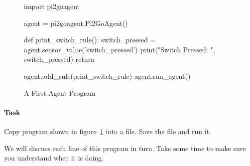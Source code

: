 \documentclass[a4,12pt]{article}
\begin{document}
\begin{figure}[htbp]
\begin{pythonlisting}
import pi2goagent

agent = pi2goagent.Pi2GoAgent()

def print_switch_rule():
    switch_pressed = agent.sensor_value('switch_pressed')
    print("Switch Pressed: ", switch_pressed)
    return

agent.add_rule(print_switch_rule)
agent.run_agent()
\end{pythonlisting}
\caption{A First Agent Program}
\label{code:print_rule}
\end{figure}

\paragraph{Task} Copy program shown in figure~\ref{code:print_rule} into a file.   Save the file and run it.  

We will discuss each line of this program in turn.  Take some time to make sure you understand what it is doing.
\end{document}
